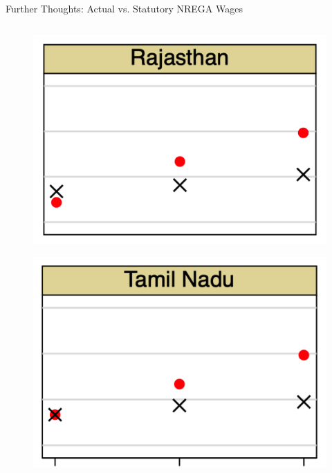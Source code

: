 \begin{frame}{Further Thoughts: Actual vs. Statutory NREGA Wages}
\begin{columns}[T]
        \begin{column}{0.3\textwidth}
            \begin{figure}
            \centering
            \includegraphics[height = 0.29 \textheight]{images/survey1.png}
            \end{figure}
            \begin{figure}
                \centering
                \includegraphics[height = 0.29 \textheight]{images/survey2.png}
            \end{figure}
            
        \end{column}
    \end{columns}
    \vspace{15pt}
\end{frame}

